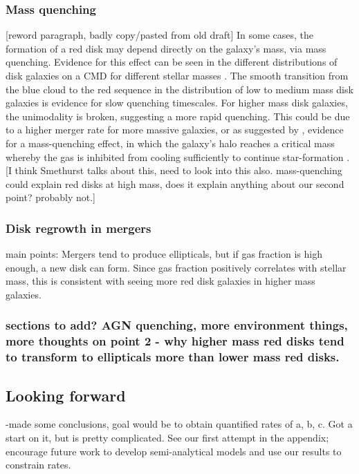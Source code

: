 \documentclass[useAMS,usenatbib]{mn2e}
\begin{document}
\subsubsection{Mass quenching}
[reword paragraph, badly copy/pasted from old draft]
In some cases, the formation of a red disk may depend directly on the galaxy's mass, via mass quenching. Evidence for this effect can be seen in the different distributions of disk galaxies on a CMD for different stellar masses \citep{Schawinski2014,Powell2017}. The smooth transition from the blue cloud to the red sequence in the distribution of low to medium mass disk galaxies is evidence for slow quenching timescales. For higher mass disk galaxies, the unimodality is broken, suggesting a more rapid quenching. This could be due to a higher merger rate for more massive galaxies, or as suggested by \citet{Schawinski2014}, evidence for a mass-quenching effect, in which the galaxy's halo reaches a critical mass whereby the gas is inhibited from cooling sufficiently to continue star-formation \citep{Kormendy2004,Dekel2006,Peng2010}. [I think Smethurst talks about this, need to look into this also. mass-quenching could explain red disks at high mass, does it explain anything about our second point? probably not.]


\subsubsection{Disk regrowth in mergers}
main points: Mergers tend to produce ellipticals, but if gas fraction is high enough, a new disk can form. Since gas fraction positively correlates with stellar mass, this is consistent with seeing more red disk galaxies in higher mass galaxies. \citep{Sparre2016,Springel2005a,Robertson2006,Governato2009}

\subsubsection{sections to add? AGN quenching, more environment things, more thoughts on point 2 - why higher mass red disks tend to transform to ellipticals more than lower mass red disks.}

\subsection{Looking forward}
-made some conclusions, goal would be to obtain quantified rates of a, b, c. Got a start on it, but is pretty complicated. See our first attempt in the appendix; encourage future work to develop semi-analytical models and use our results to constrain rates. 
\end{document}
